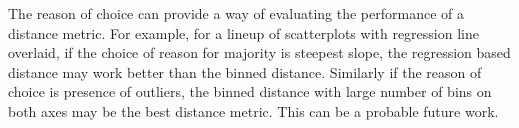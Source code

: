 \documentclass[12]{article}
\begin{document}
The reason of choice can provide a way of evaluating the performance of a distance metric. For example, for a lineup of scatterplots with regression line overlaid, if the choice of reason for majority is steepest slope, the regression based distance may work better than the binned distance. Similarly if the reason of choice is presence of outliers, the binned distance with large number of bins on both axes may be the best distance metric. This can be a probable future work.




\end{document}
